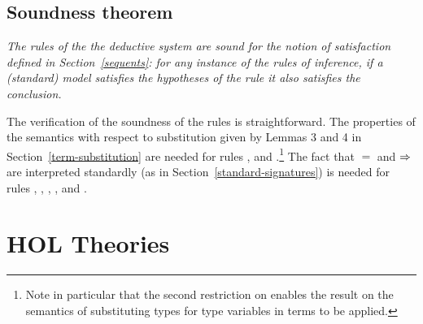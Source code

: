 \subsection{Soundness theorem}
\label{soundness}

\emph{The rules of the the \HOL{} deductive system are {\em sound} for
  the notion of satisfaction defined in Section~\ref{sequents}: for
  any instance of the rules of inference, if a (standard) model
  satisfies the hypotheses of the rule it also satisfies the
  conclusion.}

\medskip

The verification of the soundness of the rules is straightforward.
The properties of the semantics with respect to substitution given by
Lemmas 3 and 4 in Section~\ref{term-substitution} are needed for rules
,  and
.\footnote{Note in
  particular that the second restriction on  enables
  the result on the semantics of substituting types for type variables
  in terms to be applied.}  The fact that $=$ and $\Rightarrow$ are
interpreted standardly (as in Section~\ref{standard-signatures}) is
needed for rules ,
,
, ,
 and .

\section{HOL Theories}
\label{theories}

